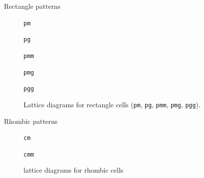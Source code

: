 \documentclass{beamer}
\begin{document}
\begin{frame}{Rectangle patterns}
  \begin{figure}
    \centering
    \begin{minipage}[t]{0.31\textwidth}
      \centering
      
      \caption*{\texttt{pm}}
    \end{minipage}\hspace{1.cm5}
    \begin{minipage}[t]{0.28\textwidth}
      \centering
      
      \caption*{\texttt{pg}}
    \end{minipage}
    

    \begin{minipage}[t]{0.29\textwidth}
      \centering
      
      \caption*{\texttt{pmm}}
    \end{minipage}\hfill
    \begin{minipage}[t]{0.3\textwidth}
      \centering
      
      \caption*{\texttt{pmg}}
    \end{minipage}\hfill
    \begin{minipage}[t]{0.3\textwidth}
      \centering
      
      \caption*{\texttt{pgg}}
    \end{minipage}

    \caption{Lattice diagrams for rectangle cells (\texttt{pm}, \texttt{pg}, \texttt{pmm}, \texttt{pmg}, \texttt{pgg}).}
  \end{figure}
\end{frame}



\begin{frame}{Rhombic patterns}
  \begin{figure}
    \centering
    \begin{minipage}[t]{0.45\textwidth}
      \centering
      
      \caption*{\texttt{cm}}
    \end{minipage}\hfill%
    \begin{minipage}[t]{0.45\textwidth}
      \centering
      
      \caption*{\texttt{cmm}}
    \end{minipage}
    \caption{lattice diagrams for rhombic cells}
  \end{figure}
\end{frame}
\end{document}

